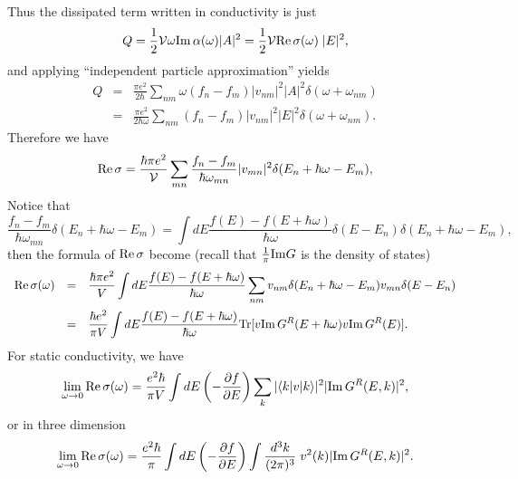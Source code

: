 \documentclass{book}
\newcommand{\bra}[1]{{\langle#1|}}
\newcommand{\ket}[1]{{|#1\rangle}}
\renewcommand{\Re}{{\rm Re}}
\renewcommand{\Im}{{\rm Im}}
\newcommand{\Tr}{{\rm Tr}}
\numberwithin{equation}{section}
\begin{document}
Thus the dissipated term written in conductivity is just
\begin{equation}
  Q=\frac{1}{2}{\cal V}\omega\Im\,\alpha(\omega)|A|^2=
  \frac{1}{2}{\cal V}\Re\,\sigma(\omega)\;|E|^2,
\end{equation}
and applying ``independent particle approximation'' yields
\begin{equation}
  \begin{array}{rcl}
    Q&=&\displaystyle\frac{\pi e^2}{2\hbar}\sum_{nm}\omega(f_n-f_m)|v_{nm}|^2|A|^2
    \delta(\omega+\omega_{nm})\\
    &=&\displaystyle\frac{\pi e^2}{2\hbar\omega}\sum_{nm}(f_n-f_m)|v_{nm}|^2|E|^2
    \delta(\omega+\omega_{nm}).
  \end{array}
\end{equation}
Therefore we have
\begin{equation}
  \Re\,\sigma=\frac{\hbar\pi e^2}{{\cal V}}\sum_{mn}
  \frac{f_n-f_m}{\hbar\omega_{mn}}|v_{mn}|^2\delta(E_n+\hbar\omega-E_m),
\end{equation}
Notice that 
\begin{equation}
  \frac{f_n-f_m}{\hbar\omega_{mn}}\delta(E_n+\hbar\omega-E_m)=
  \int dE\frac{f(E)-f(E+\hbar\omega)}{\hbar\omega}
  \delta(E-E_n)\delta(E_n+\hbar\omega-E_m),
\end{equation}
then the formula of $\Re\,\sigma$ become (recall that
$\frac{1}{\pi}\Im G$ is the density of states)
\begin{equation}
  \begin{array}{rcl}
    \Re\,\sigma(\omega)&=&\displaystyle\frac{\hbar\pi e^2}{V} \int
    dE\frac{f(E)-f(E+\hbar\omega)}{\hbar\omega}\sum_{nm}
    v_{nm}\delta(E_n+\hbar\omega-E_m)v_{mn}\delta(E-E_n)\\\vbox to
    20pt{} &=&\displaystyle\frac{\hbar e^2}{\pi V}\int dE
    \frac{f(E)-f(E+\hbar\omega)}{\hbar\omega}
    \Tr[v\Im\,G^R(E+\hbar\omega)v\Im\,G^R(E)].
  \end{array}
\end{equation}
For static conductivity, we have 
\begin{equation}
  \lim_{\omega\to0}\Re\,\sigma(\omega)=
  \frac{e^2\hbar}{\pi V}\int dE
  \left(-\frac{\partial f}{\partial E}\right)
  \sum_k|\bra{k}v\ket{k}|^2|\Im\,G^R(E,k)|^2,
\end{equation}
or in three dimension
\begin{equation}
  \lim_{\omega\to0}\Re\,\sigma(\omega)=
  \frac{e^2\hbar}{\pi}\int dE
  \left(-\frac{\partial f}{\partial E}\right)
  \int \frac{d^3k}{(2\pi)^3}\; v^2(k)|\Im\,G^R(E,k)|^2.
\end{equation}
\end{document}
